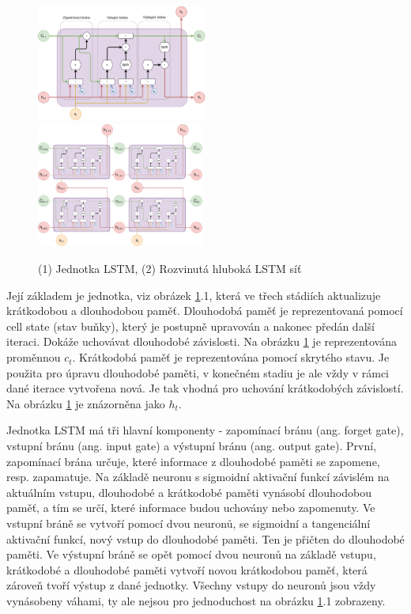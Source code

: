 \begin{figure}[]
    \centering
    \includegraphics[width=0.5\textwidth]{Figures/LSTM_unit.pdf}
    \includegraphics[width=0.49\textwidth]{Figures/LSTM_deep.pdf}
    \caption{(1) Jednotka LSTM, (2) Rozvinutá hluboká LSTM síť}
    \label{fig:lstm_unit}
\end{figure}

Její základem je jednotka, viz obrázek \ref{fig:lstm_unit}.1, která ve třech
stádiích aktualizuje krátkodobou a dlouhodobou paměť. Dlouhodobá paměť je
reprezentovaná pomocí cell state (stav buňky), který je postupně upravován a
nakonec předán další iteraci. Dokáže uchovávat dlouhodobé závislosti. Na
obrázku \ref{fig:lstm_unit} je reprezentována proměnnou $c_t$. Krátkodobá paměť
je reprezentována pomocí skrytého stavu. Je použita pro úpravu dlouhodobé
paměti, v konečném stadiu je ale vždy v rámci dané iterace vytvořena nová. Je
tak vhodná pro uchování krátkodobých závislostí. Na obrázku \ref{fig:lstm_unit}
je znázorněna jako $h_t$.

Jednotka LSTM má tři hlavní komponenty - zapomínací bránu (ang. forget gate),
vstupní bránu (ang. input gate) a výstupní bránu (ang. output gate). První,
zapomínací brána určuje, které informace z dlouhodobé paměti se zapomene, resp.
zapamatuje. Na základě neuronu s sigmoidní aktivační funkcí závislém na
aktuálním vstupu, dlouhodobé a krátkodobé paměti vynásobí dlouhodobou paměť, a
tím se určí, které informace budou uchovány nebo zapomenuty. Ve vstupní bráně
se vytvoří pomocí dvou neuronů, se sigmoidní a tangenciální aktivační funkcí, nový
vstup do dlouhodobé paměti. Ten je přičten do dlouhodobé paměti. Ve výstupní
bráně se opět pomocí dvou neuronů na základě vstupu, krátkodobé a dlouhodobé
paměti vytvoří novou krátkodobou paměť, která zároveň tvoří výstup z dané
jednotky. Všechny vstupy do neuronů jsou vždy vynásobeny váhami, ty ale nejsou
pro jednoduchost na obrázku \ref{fig:lstm_unit}.1 zobrazeny.

